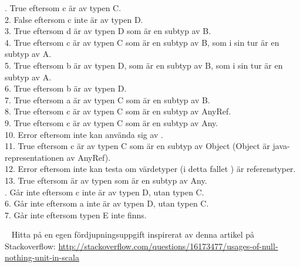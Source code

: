 . True eftersom c är av typen C. \\
2. False eftersom c inte är av typen D. \\
3. True eftersom d är av typen D som är en subtyp av B. \\
4. True eftersom c är av typen C som är en subtyp av B, som i sin tur är en subtyp av A. \\
5. True eftersom b är av typen D, som är en subtyp av B, som i sin tur är en subtyp av A. \\
6. True eftersom b är av typen D. \\
7. True eftersom a är av typen C som är en subtyp av B. \\
8. True eftersom c är av typen C som är en subtyp av AnyRef. \\
9. True eftersom c är av typen C som är en subtyp av Any. \\
10. Error eftersom  inte kan använda sig av .  \\
11. True eftersom c är av typen C som är en subtyp av Object (Object är java-representationen av AnyRef). \\
12. Error eftersom  inte kan testa om värdetyper (i detta fallet ) är referenstyper. \\
13. True eftersom  är av typen  som är en subtyp av Any. \\

. Går inte eftersom c inte är av typen D, utan typen C. \\
6. Går inte eftersom a inte är av typen D, utan typen C. \\
7. Går inte eftersom typen E inte finns. \\


\QUESTEND














\QUESTBEGIN

\Task  \what~ Hitta på en egen fördjupningsuppgift inspirerat av denna artikel på Stackoverflow: \url{http://stackoverflow.com/questions/16173477/usages-of-null-nothing-unit-in-scala}

\SOLUTION


\QUESTEND






